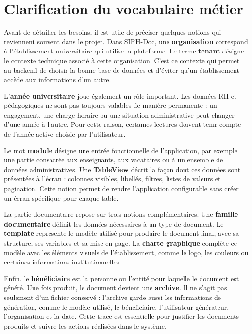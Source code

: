 \section{Clarification du vocabulaire métier}

Avant de détailler les besoins, il est utile de préciser quelques notions qui reviennent souvent dans le projet. Dans SIRH-Doc, une \textbf{organisation} correspond à l'établissement universitaire qui utilise la plateforme. Le terme \textbf{tenant} désigne le contexte technique associé à cette organisation. C'est ce contexte qui permet au backend de choisir la bonne base de données et d'éviter qu'un établissement accède aux informations d'un autre.

L'\textbf{année universitaire} joue également un rôle important. Les données RH et pédagogiques ne sont pas toujours valables de manière permanente : un engagement, une charge horaire ou une situation administrative peut changer d'une année à l'autre. Pour cette raison, certaines lectures doivent tenir compte de l'année active choisie par l'utilisateur.

Le mot \textbf{module} désigne une entrée fonctionnelle de l'application, par exemple une partie consacrée aux enseignants, aux vacataires ou à un ensemble de données administratives. Une \textbf{TableView} décrit la façon dont ces données sont présentées à l'écran : colonnes visibles, libellés, filtres, listes de valeurs et pagination. Cette notion permet de rendre l'application configurable sans créer un écran spécifique pour chaque table.

La partie documentaire repose sur trois notions complémentaires. Une \textbf{famille documentaire} définit les données nécessaires à un type de document. Le \textbf{template} représente le modèle utilisé pour produire le document final, avec sa structure, ses variables et sa mise en page. La \textbf{charte graphique} complète ce modèle avec les éléments visuels de l'établissement, comme le logo, les couleurs ou certaines informations institutionnelles.

Enfin, le \textbf{bénéficiaire} est la personne ou l'entité pour laquelle le document est généré. Une fois produit, le document devient une \textbf{archive}. Il ne s'agit pas seulement d'un fichier conservé : l'archive garde aussi les informations de génération, comme le modèle utilisé, le bénéficiaire, l'utilisateur générateur, l'organisation et la date. Cette trace est essentielle pour justifier les documents produits et suivre les actions réalisées dans le système.

